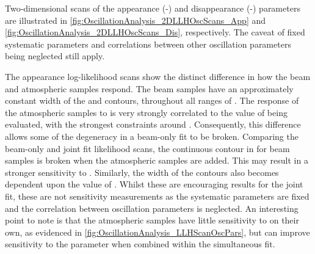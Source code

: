 
Two-dimensional scans of the appearance (-) and disappearance (-) parameters are illustrated in \autoref{fig:OscillationAnalysis_2DLLHOscScans_App} and \autoref{fig:OscillationAnalysis_2DLLHOscScans_Dis}, respectively. The caveat of fixed systematic parameters and correlations between other oscillation parameters being neglected still apply.

The appearance log-likelihood scans show the distinct difference in how the beam and atmospheric samples respond. The beam samples have an approximately constant width of the \quickmath{2\sigma} and \quickmath{3\sigma} contours, throughout all ranges of . The response of the atmospheric samples to  is very strongly correlated to the value of  being evaluated, with the strongest constraints around . Consequently, this difference allows some of the degeneracy in a beam-only fit to be broken. Comparing the beam-only and joint fit likelihood scans, the \quickmath{2\sigma} continuous contour in  for beam samples is broken when the atmospheric samples are added. This may result in a stronger sensitivity to . Similarly, the width of the \quickmath{3\sigma} contours also becomes dependent upon the value of . Whilst these are encouraging results for the joint fit, these are not sensitivity measurements as the systematic parameters are fixed and the correlation between oscillation parameters is neglected. An interesting point to note is that the atmospheric samples have little sensitivity to  on their own, as evidenced in \autoref{fig:OscillationAnalysis_LLHScanOscPars}, but can improve sensitivity to the parameter when combined within the simultaneous fit.

